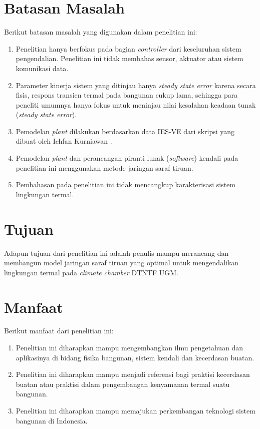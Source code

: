 \section{Batasan Masalah}
Berikut batasan masalah yang digunakan dalam penelitian ini:
\begin{enumerate}
	\item Penelitian hanya berfokus pada bagian \textit{controller} dari keseluruhan sistem pengendalian. Penelitian ini tidak membahas sensor, aktuator atau sistem komunikasi data.
	\item Parameter kinerja sistem yang ditinjau hanya \textit{steady state error} karena secara fisis, respons transien termal pada bangunan cukup lama, sehingga para peneliti umumnya hanya fokus untuk meninjau nilai kesalahan keadaan tunak (\textit{steady state error}).
	\item Pemodelan \textit{plant} dilakukan berdasarkan data IES-VE dari skripsi yang dibuat oleh Ichfan Kurniawan \cite{skripsiIchfan}.
	\item Pemodelan \textit{plant} dan perancangan piranti lunak (\textit{software}) kendali pada penelitian ini menggunakan metode jaringan saraf tiruan.
	\item Pembahasan pada penelitian ini tidak mencangkup karakterisasi sistem lingkungan termal.
\end{enumerate}

\section{Tujuan}
Adapun tujuan dari penelitian ini adalah penulis mampu merancang dan membangun model jaringan saraf tiruan yang optimal untuk mengendalikan lingkungan termal pada \textit{climate chamber} DTNTF UGM.

\section{Manfaat}
Berikut manfaat dari penelitian ini:
\begin{enumerate}
	\item Penelitian ini diharapkan mampu mengembangkan ilmu pengetahuan dan aplikasinya di bidang fisika bangunan, sistem kendali dan kecerdasan buatan.
	\item Penelitian ini diharapkan mampu menjadi referensi bagi praktisi kecerdasan buatan atau praktisi dalam pengembangan kenyamanan termal suatu bangunan.
	\item Penelitian ini diharapkan mampu memajukan perkembangan teknologi sistem bangunan di Indonesia.
\end{enumerate}


